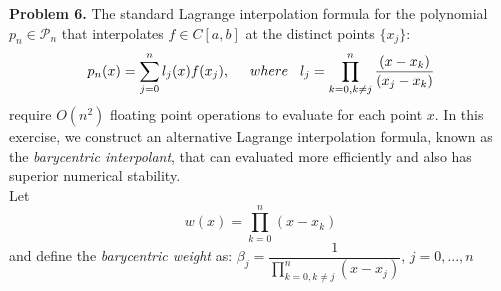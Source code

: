 \documentclass[14pt,a4paper]{article}
\begin{document}
\large\textbf{Problem 6.} The standard Lagrange interpolation formula for the polynomial $p_n \in \mathcal{P}_n$ that interpolates $f \in C[a,b]$ at the distinct points $\{x_j\}$: 
	$$p_n(x) = \sum_{j=0}^{n}l_j(x)f(x_j), \hspace{0.5cm} where \hspace{0.3cm} l_j = \prod_{k=0, k \neq j}^{n}\dfrac{(x-x_k)}{(x_j-x_k)} $$ 
	require $O(n^2)$ floating point operations to evaluate for each point $x$. In this exercise, we construct an alternative Lagrange interpolation formula, known as the \textit{barycentric interpolant}, that can evaluated more efficiently and also has superior numerical stability.\\
	Let $$w(x) = \prod_{k=0}^{n}(x-x_k)$$ and define the \textit{barycentric weight} as: \hspace{1cm} $\beta_j = \dfrac{1}{\prod_{k=0,k \neq j}^{n}(x-x_j)}$, $j = 0, ..., n$
\end{document}
